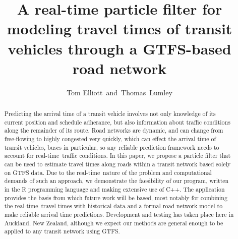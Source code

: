 \documentclass[times, doublespace]{anzsauth}
\newcommand{\rt}{real-time\ }
\begin{document}
\cleanlookdateon
{}
\title{A real-time particle filter for modeling travel times of transit vehicles through a GTFS-based road network}
\author{Tom Elliott\corrauth~and~Thomas~Lumley}
\address{
    Department of Statistics, University of Auckland, 
    Auckland 1142, New Zealand\\
    Email: \texttt{tom.elliott@auckland.ac.nz}
}

\begin{abstract}
Predicting the arrival time of a transit vehicle involves not only
knowledge of its current position and schedule adherance,
but also information about traffic conditions along the remainder of its route.
Road networks are dynamic, 
and can change from free-flowing to highly congested very quickly,
which can effect the arrival time of transit vehicles, 
buses in particular,
so any reliable prediction framework needs to account for \rt traffic conditions.
In this paper,
we propose a particle filter that can be used to estimate travel times
along roads within a transit network based solely on GTFS data.
Due to the \rt nature of the problem and computational demands of such an approach,
we demonstrate the faesibility of our program, 
written in the R programming language and making extensive use of C++.
The application provides the basis from which future work will be based,
most notably for combining the \rt travel times with historical data and a 
formal road network model to make reliable arrival time predictions.
Development and testing has taken place here in Auckland, New Zealand,
although we expect our methods are general enough to be applied to any
transit network using GTFS.
\end{abstract}


\maketitle




% 



\end{document}
